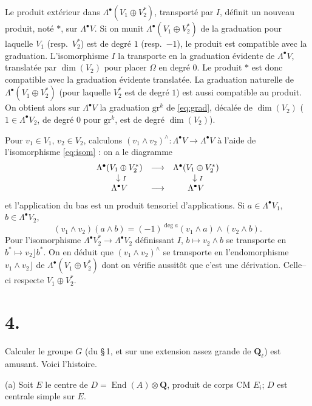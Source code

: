 \documentclass[11pt,a4paper]{article}
\theoremstyle{plain}
\theoremstyle{definition}
\DeclareMathOperator{\End}{End}
\begin{document}
Le produit ext\'erieur dans $\Lambda^\bullet(V_1 \oplus V_2^*)$, transport\'e par $I$, d\'efinit un nouveau produit, not\'e $*$, sur $\Lambda^\bullet V$. Si on munit $\Lambda^\bullet(V_1 \oplus V_2^*)$ de la graduation pour laquelle $V_1$ (resp.\ $V_2^*$) est de degr\'e $1$ (resp.\ $-1$), le produit est compatible avec la graduation. L'isomorphisme $I$ la transporte en la graduation \'evidente de $\Lambda^\bullet V$, translat\'ee par $\dim(V_2)$ pour placer $\Omega$ en degr\'e $0$. Le produit $*$ est donc compatible avec la graduation \'evidente translat\'ee. La graduation naturelle de $\Lambda^\bullet(V_1 \oplus V_2^*)$ (pour laquelle $V_2^*$ est de degr\'e $1$) est aussi compatible au produit. On obtient alors sur $\Lambda^\bullet V$ la graduation $\mathrm{gr}^k$ de \eqref{eq:grad}, d\'ecal\'ee de $\dim(V_2)$ ($1 \in \Lambda^\bullet V_2$, de degr\'e $0$ pour $\mathrm{gr}^k$, est de degr\'e $\dim(V_2)$).

Pour $v_1 \in V_1$, $v_2 \in V_2$, calculons $(v_1 \wedge v_2)^\wedge : \Lambda^\bullet V \to \Lambda^\bullet V$ \`a l'aide de l'isomorphisme \eqref{eq:isom} : on a le diagramme
\[
\begin{array}{ccc}
\Lambda^\bullet(V_1 \oplus V_2^*) & \longrightarrow & \Lambda^\bullet(V_1 \oplus V_2^*) \\
\downarrow\rlap{$\scriptstyle I$} & & \downarrow\rlap{$\scriptstyle I$} \\
\Lambda^\bullet V & \longrightarrow & \Lambda^\bullet V
\end{array}
\]
et l'application du bas est un produit tensoriel d'applications. Si $a \in \Lambda^\bullet V_1$, $b \in \Lambda^\bullet V_2$,
\[
(v_1 \wedge v_2)(a \wedge b) = (-1)^{\deg a} (v_1 \wedge a) \wedge (v_2 \wedge b) .
\]
Pour l'isomorphisme $\Lambda^\bullet V_2^* \to \Lambda^\bullet V_2$ d\'efinissant $I$, $b \mapsto v_2 \wedge b$ se transporte en $b^* \mapsto v_2 \rfloor b^*$. On en d\'eduit que $(v_1 \wedge v_2)^\wedge$ se transporte en l'endomorphisme $v_1 \wedge v_2 \rfloor$ de $\Lambda^\bullet(V_1 \oplus V_2^*)$ dont on v\'erifie aussit\^ot que c'est une d\'erivation. Celle--ci respecte $V_1 \oplus V_2^*$.

\section*{4.}

Calculer le groupe $G$ (du \S\,1, et sur une extension assez grande de $\mathbf{Q}_\ell$) est amusant. Voici l'histoire.

(a) Soit $E$ le centre de $D = \End(A) \otimes \mathbf{Q}$, produit de corps CM $E_i$; $D$ est centrale simple sur $E$.
\end{document}
